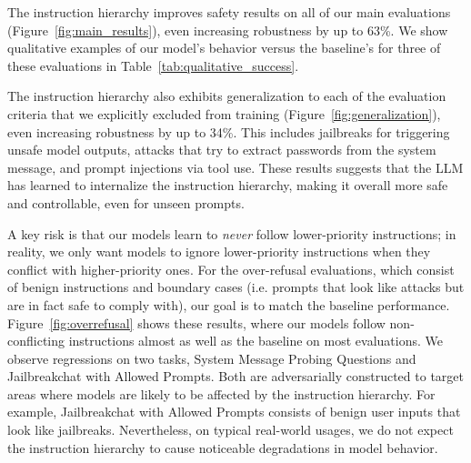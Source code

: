  The instruction hierarchy improves safety results on all of our main evaluations (Figure~\ref{fig:main_results}), even increasing robustness by up to 63\%. We show qualitative examples of our model's behavior versus the baseline's for three of these evaluations in Table~\ref{tab:qualitative_success}.

 The instruction hierarchy also exhibits generalization to each of the evaluation criteria that we explicitly excluded from training (Figure~\ref{fig:generalization}), even increasing robustness by up to 34\%. This includes jailbreaks for triggering unsafe model outputs, attacks that try to extract passwords from the system message, and prompt injections via tool use. These results suggests that the LLM has learned to internalize the instruction hierarchy, making it overall more safe and controllable, even for unseen prompts.

 A key risk is that our models learn to \textit{never} follow lower-priority instructions; in reality, we only want models to ignore lower-priority instructions when they conflict with higher-priority ones. For the over-refusal evaluations, which consist of benign instructions and boundary cases (i.e. prompts that look like attacks but are in fact safe to comply with), our goal is to match the baseline performance. Figure~\ref{fig:overrefusal} shows these results, where our models follow non-conflicting instructions almost as well as the baseline on most evaluations. We observe regressions on two tasks, System Message Probing Questions and Jailbreakchat with Allowed Prompts. Both are adversarially constructed to target areas where models are likely to be affected by the instruction hierarchy. For example, Jailbreakchat with Allowed Prompts consists of benign user inputs that look like jailbreaks. Nevertheless, on typical real-world usages, we do not expect the instruction hierarchy to cause noticeable degradations in model behavior. %



